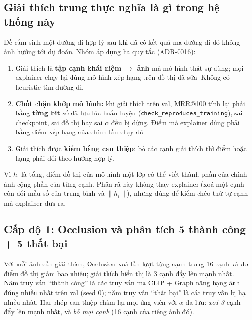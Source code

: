\documentclass[12pt, a4paper]{article}
\makeatletter
\newcommand{\code}[1]{\texttt{#1}}
\newcommand{\mrr}{MRR@100}
\makeatother
\begin{document}
\subsection{Giải thích trung thực nghĩa là gì trong hệ thống này}
Đề cấm sinh một đường đi hợp lý sau khi đã có kết quả mà đường đi đó không ảnh hưởng tới dự đoán. Nhóm áp dụng ba quy tắc (ADR-0016):
\begin{enumerate}
\item Giải thích là \textbf{tập cạnh khái niệm $\to$ ảnh} mà mô hình thật sự dùng; mọi explainer chạy lại đúng mô hình xếp hạng trên đồ thị đã sửa. Không có heuristic tìm đường đi.
\item \textbf{Chốt chặn khớp mô hình:} khi giải thích trên val, \mrr{} tính lại phải bằng \textbf{từng bit} số đã lưu lúc huấn luyện (\code{check\_reproduces\_training}); sai checkpoint, sai đồ thị hay sai $\alpha$ đều bị dừng. Điểm mà explainer dùng phải bằng điểm xếp hạng của chính lần chạy đó.
\item Giải thích được \textbf{kiểm bằng can thiệp}: bỏ các cạnh giải thích thì điểm hoặc hạng phải đổi theo hướng hợp lý.
\end{enumerate}
Vì $h_i$ là tổng, điểm đồ thị của mô hình một lớp có thể viết thành phần của chính ảnh cộng phần của từng cạnh. Phân rã này không thay explainer (xoá một cạnh còn đổi mẫu số của trung bình và $\|h_i\|$), nhưng dùng để kiểm chéo thứ tự cạnh mà explainer đưa ra.

\subsection{Cấp độ 1: Occlusion và phân tích 5 thành công + 5 thất bại}
Với mỗi ảnh cần giải thích, Occlusion xoá lần lượt từng cạnh trong 16 cạnh và đo điểm đồ thị giảm bao nhiêu; giải thích hiển thị là 3 cạnh đẩy lên mạnh nhất. Năm truy vấn ``thành công'' là các truy vấn mà CLIP + Graph nâng hạng ảnh đúng nhiều nhất trên val (seed 0); năm truy vấn ``thất bại'' là các truy vấn bị hạ nhiều nhất. Hai phép can thiệp chấm lại mọi ứng viên với $\alpha$ đã lưu: \emph{xoá 3} cạnh đẩy lên mạnh nhất, và \emph{bỏ mọi cạnh} (16 cạnh của riêng ảnh đó).
\end{document}
